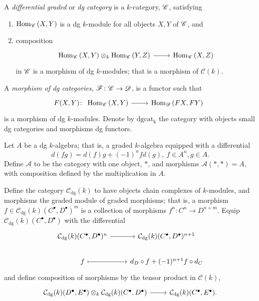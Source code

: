 \documentclass[dissertation.tex]{subfiles}
\begin{document}
\begin{defn}
  A {\it differential graded} or {\it dg category} is a $k$-category, $\mathscr{C}$, satisfying
  \begin{enumerate}
  \item
    $\operatorname{Hom}_{\mathscr{C}}\left(X,Y\right)$ is a dg $k$-module for all objects $X,Y$ of $\mathscr{C}$, and
  \item
    composition 
    $$\begin{tikzcd}
      \Hom{\CC}{X,Y} \otimes_k \Hom{\CC}{Y,Z} \arrow{r} & \Hom{\CC}{X,Z}
    \end{tikzcd}$$
    in $\mathscr{C}$ is a morphism of dg $k$-modules;
    that is a morphism of $\mathcal{C}(k)$.
  \end{enumerate}
  
  A {\it morphism of dg categories}, $\mathscr{F} \colon \mathscr{C} \rightarrow \mathscr{D}$, is a functor such that
  $$F(X,Y) \colon 
  \begin{tikzcd}
    \Hom{\CC}{X,Y} \arrow{r} & \Hom{\D}{FX,FY}
  \end{tikzcd}$$
  is a morphism of dg $k$-modules.
  Denote by $\operatorname{dgcat_k}$ the category with objects small dg categories and morphisms dg functors.
\end{defn}

\begin{eg}
  \begin{description}[style=nextline]
  \item[dg category with one object]
    Let $A$ be a dg $k$-algebra; that is, a graded $k$-algebra equipped with a differential
    $$d(fg) = d(f)g + (-1)^nfd(g),\ f \in A^n, g \in A.$$
    Define $\mathscr{A}$ to be the category with one object, $\ast$, and morphisms $\mathscr{A}(\ast, \ast) = A$, with composition defined by the multiplication in $A$.
  \item[dg $k$-modules]
    Define the category $\mathcal{C}_\text{dg}(k)$ to have objects chain complexes of $k$-modules, and morphisms the graded module of graded morphisms; that is, a morphism $f \in \mathcal{C}_\text{dg}(k)(C^\bullet, D^\bullet)^m$ is a collection of morphisms $f^n \colon C^n \rightarrow D^{n+m}$.
    Equip $\mathcal{C}_\text{dg}(k)(C^\bullet, D^\bullet)$ with the differential
    $$\begin{tikzcd}
      \mathcal{C}_\text{dg}(k)(C^\bullet, D^\bullet)^n \arrow{r} & \mathcal{C}_\text{dg}(k)(C^\bullet, D^\bullet)^{n+1}\\
      f \arrow[mapsto]{r} & d_D \circ f + (-1)^{n+1}f \circ d_C
    \end{tikzcd}$$
    and define composition of morphisms by the tensor product in $\mathcal{C}(k)$,
    $$\begin{tikzcd}
      \mathcal{C}_\text{dg}(k)(D^\bullet, E^\bullet) \otimes_k \mathcal{C}_\text{dg}(k)(C^\bullet, D^\bullet) \arrow{r} & \mathcal{C}_\text{dg}(k)(C^\bullet, E^\bullet).
    \end{tikzcd}$$
  \end{description}
\end{eg}
\end{document}
